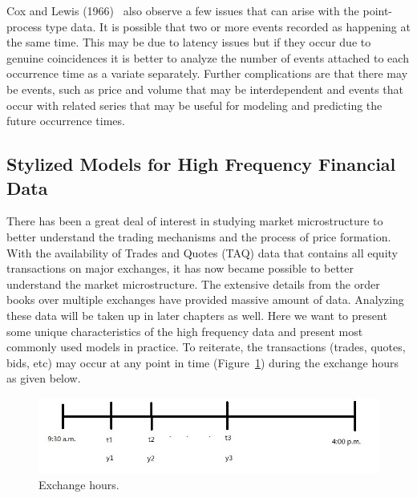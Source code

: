 Cox and Lewis (1966)~\cite{cox1966} also observe a few issues that can arise with the point-process type data. It is possible that two or more events recorded as happening at the same time. This may be due to latency issues but if they occur due to genuine coincidences it is better to analyze the number of events attached to each occurrence time as a variate separately. Further complications are that there may be events, such as price and volume that may be interdependent and events that occur with related series that may be useful for modeling and predicting the future occurrence times.



\subsection{Stylized Models for High Frequency Financial Data}


There has been a great deal of interest in studying market microstructure to better understand the trading mechanisms and the process of price formation. With the availability of Trades and Quotes (TAQ) data that contains all equity transactions on major exchanges, it has now became possible to better understand the market microstructure. The extensive details from the order books over multiple exchanges have provided massive amount of data. Analyzing these data will be taken up in later chapters as well. Here we want to present some unique characteristics of the high frequency data and present most commonly used models in practice. To reiterate, the transactions (trades, quotes, bids, etc) may occur at any point in time (Figure~\ref{fig:exchhours}) during the exchange hours as given below.

	\begin{figure}[!ht]
	\centering
	\includegraphics[width=\textwidth]{chapters/chapter_advanced/figures/33d1.jpg}
	\caption{Exchange hours. \label{fig:exchhours}}
	\end{figure}


